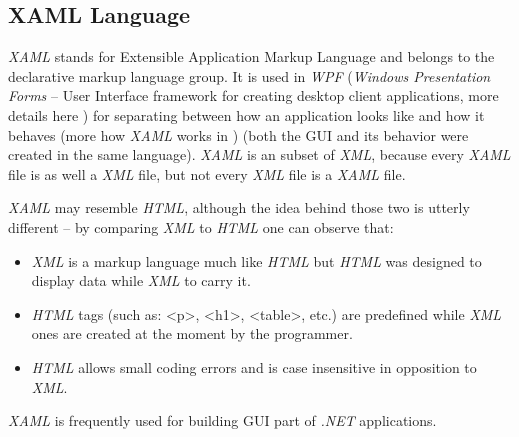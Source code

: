 \subsection{XAML Language}   
    \textit{XAML} stands for Extensible Application Markup Language and belongs to the declarative markup language group. It is used in \textit{WPF} (\textit{Windows Presentation Forms} -- User Interface framework for creating desktop client applications, more details here \cite{wpf}) for separating between how an application looks like and how it behaves (more how \textit{XAML} works in \cite{how_xaml_works}) (both the GUI and its behavior were created in the same language). \textit{XAML} is an subset of \textit{XML}, because every \textit{XAML} file is as well a \textit{XML} file, but not every \textit{XML} file is a \textit{XAML} file.
    
    \textit{XAML} may resemble \textit{HTML}, although the idea behind those two is utterly different -- by comparing \textit{XML} to \textit{HTML} one can observe that:
    \begin{itemize}
        \item \textit{XML} is a markup language much like \textit{HTML} but \textit{HTML} was designed to display data while \textit{XML} to carry it.
        \item \textit{HTML} tags (such as: <p>, <h1>, <table>, etc.) are predefined while \textit{XML} ones are created at the moment by the programmer.
        \item \textit{HTML} allows small coding errors and is case insensitive in opposition to \textit{XML}.
    \end{itemize}

    \noindent
    \textit{XAML} is frequently used for building GUI part of  \textit{.NET} applications.